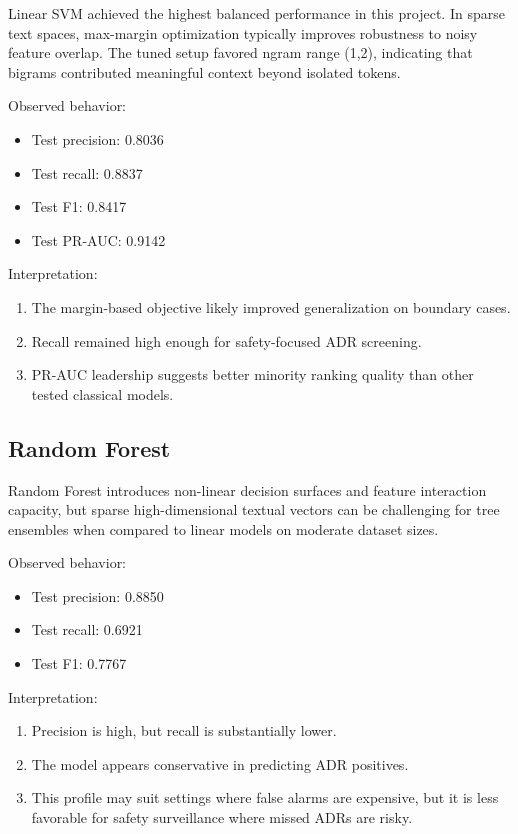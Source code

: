 \documentclass[11pt]{article}
\begin{document}
Linear SVM achieved the highest balanced performance in this project. In sparse text spaces, max-margin optimization typically improves robustness to noisy feature overlap. The tuned setup favored ngram range (1,2), indicating that bigrams contributed meaningful context beyond isolated tokens.


Observed behavior:


\begin{itemize}
  \item Test precision: 0.8036
  \item Test recall: 0.8837
  \item Test F1: 0.8417
  \item Test PR-AUC: 0.9142
\end{itemize}

Interpretation:


\begin{enumerate}
  \item The margin-based objective likely improved generalization on boundary cases.
  \item Recall remained high enough for safety-focused ADR screening.
  \item PR-AUC leadership suggests better minority ranking quality than other tested classical models.
\end{enumerate}

\subsection{Random Forest}

Random Forest introduces non-linear decision surfaces and feature interaction capacity, but sparse high-dimensional textual vectors can be challenging for tree ensembles when compared to linear models on moderate dataset sizes.


Observed behavior:


\begin{itemize}
  \item Test precision: 0.8850
  \item Test recall: 0.6921
  \item Test F1: 0.7767
\end{itemize}

Interpretation:


\begin{enumerate}
  \item Precision is high, but recall is substantially lower.
  \item The model appears conservative in predicting ADR positives.
  \item This profile may suit settings where false alarms are expensive, but it is less favorable for safety surveillance where missed ADRs are risky.
\end{enumerate}
\end{document}
